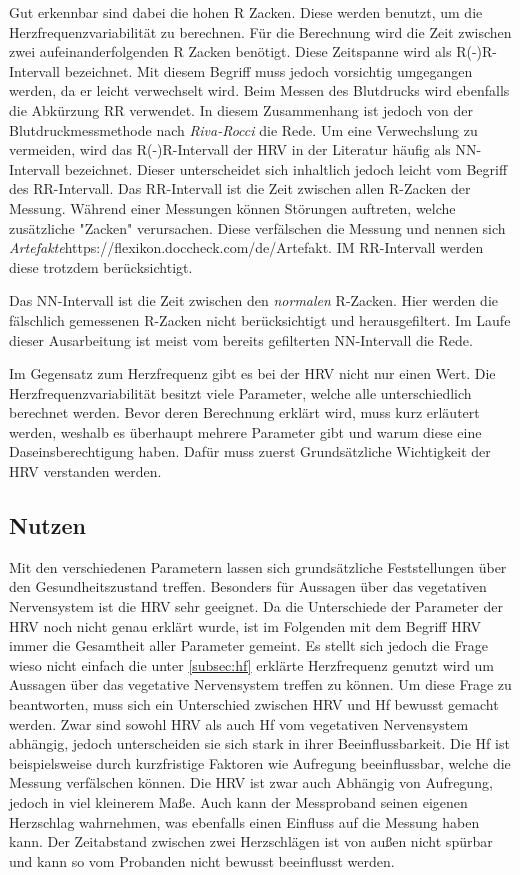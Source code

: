  Gut erkennbar sind dabei die hohen R Zacken. Diese werden benutzt, um die Herzfrequenzvariabilität zu berechnen.
 Für die Berechnung wird die Zeit zwischen zwei aufeinanderfolgenden R Zacken benötigt. Diese Zeitspanne wird als R(-)R-Intervall bezeichnet. Mit diesem Begriff muss jedoch vorsichtig umgegangen werden, da er leicht verwechselt wird. Beim Messen des Blutdrucks wird ebenfalls die Abkürzung RR verwendet. In diesem Zusammenhang ist jedoch von der Blutdruckmessmethode nach \textit{Riva-Rocci} die Rede. Um eine Verwechslung zu vermeiden, wird das R(-)R-Intervall der HRV in der Literatur häufig als NN-Intervall bezeichnet. Dieser unterscheidet sich inhaltlich jedoch leicht vom Begriff des RR-Intervall. 
 Das RR-Intervall ist die Zeit zwischen allen R-Zacken der Messung. Während einer Messungen können Störungen auftreten, welche zusätzliche "Zacken" verursachen. Diese verfälschen die Messung und nennen sich \textit{Artefakte}https://flexikon.doccheck.com/de/Artefakt. IM RR-Intervall werden diese trotzdem berücksichtigt.
 
 Das NN-Intervall ist die Zeit zwischen den \textit{normalen} R-Zacken. Hier werden die fälschlich gemessenen R-Zacken nicht berücksichtigt und herausgefiltert. Im Laufe dieser Ausarbeitung ist meist vom bereits gefilterten NN-Intervall die Rede.
 

 Im Gegensatz zum Herzfrequenz gibt es bei der HRV nicht nur einen Wert. Die Herzfrequenzvariabilität besitzt viele Parameter, welche alle unterschiedlich berechnet werden.\color{red} Bevor deren Berechnung erklärt wird, muss kurz erläutert werden, weshalb es überhaupt mehrere Parameter gibt und warum diese eine Daseinsberechtigung haben. Dafür muss zuerst Grundsätzliche Wichtigkeit der HRV verstanden werden.\color{black} 
 
 \subsection{Nutzen}
 Mit den verschiedenen Parametern lassen sich grundsätzliche Feststellungen über den Gesundheitszustand treffen. Besonders für Aussagen über das vegetativen Nervensystem ist die HRV sehr geeignet. Da die Unterschiede der Parameter der HRV noch nicht genau erklärt wurde, ist im Folgenden mit dem Begriff HRV immer die Gesamtheit aller \color{red} Parameter\color{black} gemeint.
 \color{red} 
 Es stellt sich jedoch die Frage wieso nicht einfach die unter \ref{subsec:hf} erklärte Herzfrequenz genutzt wird um Aussagen über das vegetative Nervensystem treffen zu können. Um diese Frage zu beantworten, muss sich ein Unterschied zwischen HRV und Hf bewusst gemacht werden. Zwar sind sowohl HRV als auch Hf vom vegetativen Nervensystem abhängig, jedoch unterscheiden sie sich stark in ihrer Beeinflussbarkeit. Die Hf ist beispielsweise durch kurzfristige Faktoren wie Aufregung beeinflussbar, welche die Messung verfälschen können. Die HRV ist zwar auch Abhängig von Aufregung, jedoch in viel kleinerem Maße. Auch kann der Messproband seinen eigenen Herzschlag wahrnehmen, was ebenfalls einen Einfluss auf die Messung haben kann. Der Zeitabstand zwischen zwei Herzschlägen ist von außen nicht spürbar und kann so vom Probanden nicht bewusst beeinflusst werden. \\

